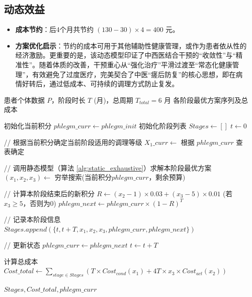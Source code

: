 \documentclass[12pt,a4paper]{article}
\begin{document}
\subsection{动态效益}
\begin{itemize}
    \item \textbf{成本节约}：后4个月共节约 $(130-30) \times 4 = 400$ 元。
    \item \textbf{方案优化启示}：节约的成本可用于其他辅助性健康管理，或作为患者依从性的经济激励。更重要的是，该动态模型印证了中西医结合干预的“收敛性”与“精准性”。随着体质的改善，干预重心从“强化治疗”平滑过渡至“常态化健康管理”，有效避免了过度医疗，完美契合了中医“瘥后防复”的核心思想，即在病情好转后，通过低成本、可持续的调理方式防止复发。
\end{itemize}

\begin{algorithm}[H]
\caption{多阶段动态优化模型（以 $K$ 个月为一个阶段）}
\label{alg:dynamic_optimization}
\begin{algorithmic}[1]
\REQUIRE 患者个体数据 $P$，阶段时长 $T$ (月)，总周期 $T_{total}=6$ 月
\ENSURE 各阶段最优方案序列及总成本

\STATE 初始化当前积分 $phlegm\_curr \gets phlegm\_init$
\STATE 初始化阶段列表 $Stages \gets []$
\STATE $t \gets 0$

    \STATE // 根据当前积分确定当前阶段适用的调理等级
    \STATE $X_1\_curr \gets$ 根据 $phlegm\_curr$ 查表确定
    
    \STATE // 调用静态模型（算法 \ref{alg:static_exhaustive}）求解本阶段最优方案
    \STATE $(x_1, x_2, x_3) \gets$ 穷举搜索(当前积分$phlegm\_curr$，剩余预算)
    
    \STATE // 计算本阶段结束后的新积分
    \STATE $R \gets (x_2 - 1) \times 0.03 + (x_3 - 5) \times 0.01$ (若$x_3 \ge 5$，否则为0)
    \STATE $phlegm\_next \gets phlegm\_curr \times (1 - R)^T$
    
    \STATE // 记录本阶段信息
    \STATE $Stages.append(\{t, t+T, x_1, x_2, x_3, phlegm\_curr, phlegm\_next\})$
    
    \STATE // 更新状态
    \STATE $phlegm\_curr \gets phlegm\_next$
    \STATE $t \gets t + T$
\ENDWHILE

\STATE 计算总成本 $Cost\_total \gets \sum_{stage \in Stages} (T \times Cost_{cond}(x_1) + 4T \times x_3 \times Cost_{act}(x_2))$

\RETURN $Stages, Cost\_total, phlegm\_curr$
\end{algorithmic}
\end{algorithm}
\end{document}

